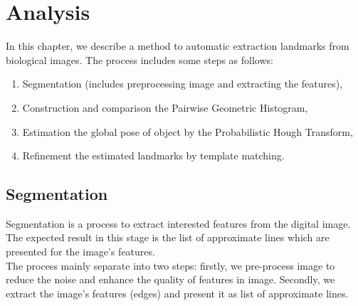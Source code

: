 \chapter{Analysis}
In this chapter, we describe a method to automatic extraction landmarks from biological images. The process includes some steps as follows:
\begin{enumerate}
\item Segmentation (includes preprocessing image and extracting the features),
\item Construction and comparison the Pairwise Geometric Histogram,
\item Estimation the global pose of object by the Probabilistic Hough Transform,
\item Refinement the estimated landmarks by template matching.
\end{enumerate}
\section{Segmentation}
Segmentation is a process to extract interested features from the digital image. The expected result in this stage is the list of approximate lines which are presented for the image's features.\\
The process mainly separate into two steps: firstly, we pre-process image to reduce the noise and enhance the quality of features in image. Secondly, we extract the image's features (edges) and present it as list of approximate lines.

